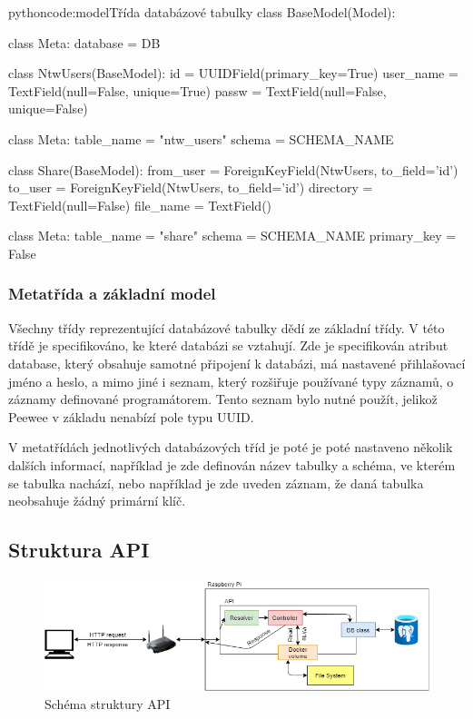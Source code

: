 \documentclass[
  glossaries,
]{kidiplom}
\begin{document}
\clearpage

\begin{kicode}{python}{code:model}{Třída databázové tabulky}
class BaseModel(Model):

    class Meta:
        database = DB

class NtwUsers(BaseModel):
    id = UUIDField(primary_key=True)
    user_name = TextField(null=False, unique=True)
    passw = TextField(null=False, unique=False)

    class Meta:
        table_name = "ntw_users"
        schema = SCHEMA_NAME
        
class Share(BaseModel):
    from_user = ForeignKeyField(NtwUsers, to_field='id')
    to_user = ForeignKeyField(NtwUsers, to_field='id')
    directory = TextField(null=False)
    file_name = TextField()

    class Meta:
        table_name = "share"
        schema = SCHEMA_NAME
        primary_key = False
\end{kicode}

\subsubsection{Metatřída a základní model}
Všechny třídy reprezentující databázové tabulky dědí ze základní třídy. V této třídě je specifikováno, ke které databázi se vztahují. Zde je specifikován atribut database, který obsahuje samotné připojení k databázi, má nastavené přihlašovací jméno a heslo, a mimo jiné i seznam, který rozšiřuje používané typy záznamů, o záznamy definované programátorem. Tento seznam bylo nutné použít, jelikož Peewee v základu nenabízí pole typu UUID.

V metatřídách jednotlivých databázových tříd je poté je poté nastaveno několik dalších informací, například je zde definován název tabulky a schéma, ve kterém se tabulka nachází, nebo například je zde uveden záznam, že daná tabulka neobsahuje žádný primární klíč.

\clearpage

\subsection{Struktura API}
\begin{figure}[htp]
    \centering
    \includegraphics[width=15cm]{API_diagram}
    \caption{Schéma struktury API}
    \label{fig:APISchema}
\end{figure}
\end{document}

